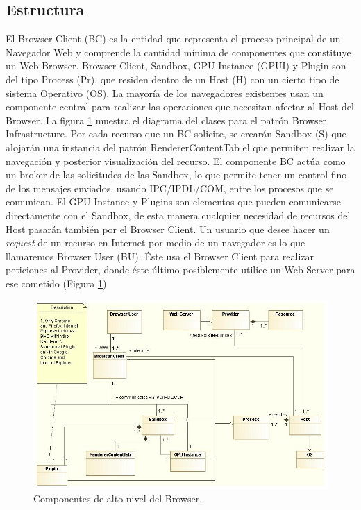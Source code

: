 \subsection{Estructura}
El Browser Client (BC) es la entidad que representa el proceso principal de un Navegador Web y comprende la cantidad mínima de componentes que constituye un Web Browser. Browser Client, Sandbox, GPU Instance (GPUI) y Plugin son del tipo Process (Pr), que residen dentro de un Host (H) con un cierto tipo de sistema Operativo (OS). La mayoría de los navegadores existentes usan un componente central para realizar las operaciones que necesitan afectar al Host del Browser. La figura \ref{fig:BIPatt} muestra el diagrama del clases para el patrón Browser Infrastructure. Por cada recurso que un BC solicite, se crearán Sandbox (S) que alojarán una instancia del patrón RendererContentTab el que permiten realizar la navegación y posterior visualización del recurso.
El componente BC actúa como un broker de las solicitudes de las Sandbox, lo que permite tener un control fino de los mensajes enviados, usando IPC/IPDL/COM, entre los procesos que se comunican. El GPU Instance y Plugins son elementos que pueden comunicarse directamente con el Sandbox, de esta manera cualquier necesidad de recursos del Host pasarán también por el Browser Client. 
Un usuario que desee hacer un \textit{request} de un recurso en Internet por medio de un navegador es lo que llamaremos Browser User (BU). Éste usa el Browser Client para realizar peticiones al Provider, donde éste último posiblemente utilice un Web Server para ese cometido (Figura \ref{fig:BIPatt})

	    \begin{figure}[h!t]
	        \centering
	        \includegraphics[scale=0.45]{figures/chap4/browserInfraPattern.jpg}
	        \caption{Componentes de alto nivel del Browser.}
	        \label{fig:BIPatt}
	    \end{figure}


